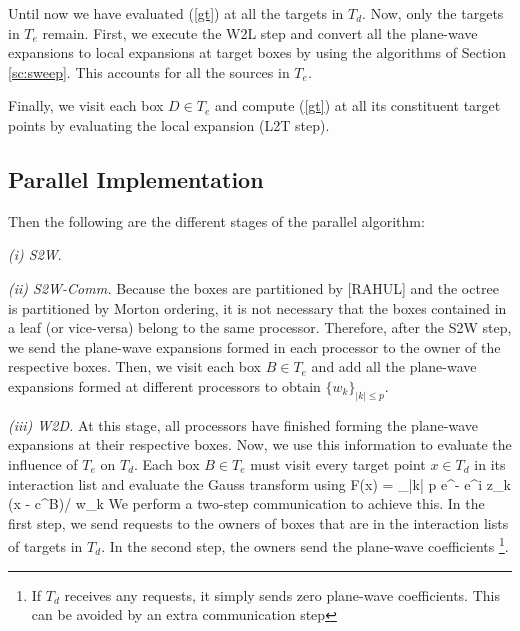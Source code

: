 Until now we have evaluated (\ref{gt}) at all the targets in $T_d$. Now, only the targets in $T_e$ remain. First, we execute
 the W2L step and convert all the plane-wave expansions to local expansions at target boxes by using the algorithms of 
 Section \ref{sc:sweep}. This accounts for all the sources in $T_e$. 

Finally, we visit each box $D \in T_e$ and compute (\ref{gt}) at all its constituent target points by evaluating the 
local expansion (L2T step). 

\subsection{Parallel Implementation}
\label{sc:parallelnufgt}

Then the following are the different stages of the parallel algorithm:

{\em (i) S2W}. 

{\em (ii) S2W-Comm.} Because the boxes are partitioned by [RAHUL] and the octree is partitioned by Morton ordering, it is not necessary that the boxes contained in a leaf (or vice-versa) belong to the same processor. Therefore, after the S2W step, we send the plane-wave expansions formed in each processor to the owner of the respective boxes. Then, we visit each box $B \in T_e$ and add all the plane-wave expansions formed at different processors to obtain $\{w_k \}_{|k| \leq p}$.  

{\em (iii) W2D.} At this stage, all processors have finished forming the plane-wave expansions at their respective boxes. 
Now, we use this information to evaluate the influence of $T_e$ on $T_d$. Each box $B \in T_e$ must visit every target point $x \in T_d$ in its interaction list and evaluate the Gauss transform using
%
\beq F(x) = \sum_{|k| \leq p} e^{-} e^{i z_k \cdot (x - c^B)/\sqrt{\delta}} w_k \eeq
%
We perform a two-step communication to achieve this. In the first step, we send requests to the owners of boxes that are in the interaction lists of targets in $T_d$. In the second step, the owners send the plane-wave coefficients \footnote{ If $T_d$ receives any requests, it simply sends zero plane-wave coefficients. This can be avoided by an extra communication step}. 

